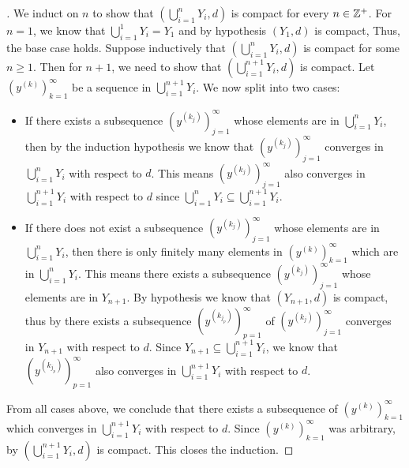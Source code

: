\begin{proof}[]
  We induct on \(n\) to show that \((\bigcup_{i = 1}^n Y_i, d)\) is compact for every \(n \in \mathbb{Z}^+\).
  For \(n = 1\), we know that \(\bigcup_{i = 1}^1 Y_i = Y_1\) and by hypothesis \((Y_1, d)\) is compact, Thus, the base case holds.
  Suppose inductively that \((\bigcup_{i = 1}^n Y_i, d)\) is compact for some \(n \geq 1\).
  Then for \(n + 1\), we need to show that \((\bigcup_{i = 1}^{n + 1} Y_i, d)\) is compact.
  Let \((y^{(k)})_{k = 1}^\infty\) be a sequence in \(\bigcup_{i = 1}^{n + 1} Y_i\).
  We now split into two cases:
  \begin{itemize}
    \item If there exists a subsequence \((y^{(k_j)})_{j = 1}^\infty\) whose elements are in \(\bigcup_{i = 1}^n Y_i\), then by the induction hypothesis we know that \((y^{(k_j)})_{j = 1}^\infty\) converges in \(\bigcup_{i = 1}^n Y_i\) with respect to \(d\).
          This means \((y^{(k_j)})_{j = 1}^\infty\) also converges in \(\bigcup_{i = 1}^{n + 1} Y_i\) with respect to \(d\) since \(\bigcup_{i = 1}^n Y_i \subseteq \bigcup_{i = 1}^{n + 1} Y_i\).
    \item If there does not exist a subsequence \((y^{(k_j)})_{j = 1}^\infty\) whose elements are in \(\bigcup_{i = 1}^n Y_i\), then there is only finitely many elements in \((y^{(k)})_{k = 1}^\infty\) which are in \(\bigcup_{i = 1}^n Y_i\).
          This means there exists a subsequence \((y^{(k_j)})_{j = 1}^\infty\) whose elements are in \(Y_{n + 1}\).
          By hypothesis we know that \((Y_{n + 1}, d)\) is compact, thus by  there exists a subsequence \((y^{(k_{j_p})})_{p = 1}^\infty\) of \((y^{(k_j)})_{j = 1}^\infty\) converges in \(Y_{n + 1}\) with respect to \(d\).
          Since \(Y_{n + 1} \subseteq \bigcup_{i = 1}^{n + 1} Y_i\), we know that \((y^{(k_{j_p})})_{p = 1}^\infty\) also converges in \(\bigcup_{i = 1}^{n + 1} Y_i\) with respect to \(d\).
  \end{itemize}
  From all cases above, we conclude that there exists a subsequence of \((y^{(k)})_{k = 1}^\infty\) which converges in \(\bigcup_{i = 1}^{n + 1} Y_i\) with respect to \(d\).
  Since \((y^{(k)})_{k = 1}^\infty\) was arbitrary, by  \((\bigcup_{i = 1}^{n + 1} Y_i, d)\) is compact.
  This closes the induction.
\end{proof}

